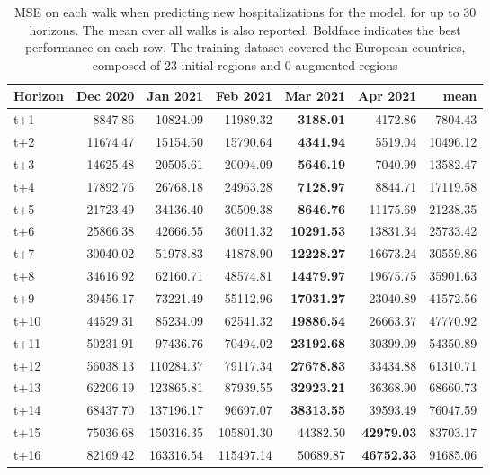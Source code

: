 \begin{table}[H]
\centering
\caption{MSE on each walk when predicting new hospitalizations for the model, for up to 30 horizons. The mean over all walks is also reported. Boldface indicates the best performance on each row. The training dataset covered the European countries, composed of 23 initial regions and 0 augmented regions }
\label{tab:MSE_walk_assembly_0}
\begin{tabular}{lrrrrrr}
\toprule
Horizon &  Dec 2020 &  Jan 2021 &  Feb 2021 &  Mar 2021 &  Apr 2021 &      mean \\
\midrule
t+1  & 8847.86  & 10824.09  & 11989.32  & \textbf{3188.01}  & 4172.86  & 7804.43  \\
t+2  & 11674.47  & 15154.50  & 15790.64  & \textbf{4341.94}  & 5519.04  & 10496.12  \\
t+3  & 14625.48  & 20505.61  & 20094.09  & \textbf{5646.19}  & 7040.99  & 13582.47  \\
t+4  & 17892.76  & 26768.18  & 24963.28  & \textbf{7128.97}  & 8844.71  & 17119.58  \\
t+5  & 21723.49  & 34136.40  & 30509.38  & \textbf{8646.76}  & 11175.69  & 21238.35  \\
t+6  & 25866.38  & 42666.55  & 36011.32  & \textbf{10291.53}  & 13831.34  & 25733.42  \\
t+7  & 30040.02  & 51978.83  & 41878.90  & \textbf{12228.27}  & 16673.24  & 30559.86  \\
t+8  & 34616.92  & 62160.71  & 48574.81  & \textbf{14479.97}  & 19675.75  & 35901.63  \\
t+9  & 39456.17  & 73221.49  & 55112.96  & \textbf{17031.27}  & 23040.89  & 41572.56  \\
t+10  & 44529.31  & 85234.09  & 62541.32  & \textbf{19886.54}  & 26663.37  & 47770.92  \\
t+11  & 50231.91  & 97436.76  & 70494.02  & \textbf{23192.68}  & 30399.09  & 54350.89  \\
t+12  & 56038.13  & 110284.37  & 79117.34  & \textbf{27678.83}  & 33434.88  & 61310.71  \\
t+13  & 62206.19  & 123865.81  & 87939.55  & \textbf{32923.21}  & 36368.90  & 68660.73  \\
t+14  & 68437.70  & 137196.17  & 96697.07  & \textbf{38313.55}  & 39593.49  & 76047.59  \\
t+15  & 75036.68  & 150316.35  & 105801.30  & 44382.50  & \textbf{42979.03}  & 83703.17  \\
t+16  & 82169.42  & 163316.54  & 115497.14  & 50689.87  & \textbf{46752.33}  & 91685.06  \\

\end{tabular}
\end{table}
